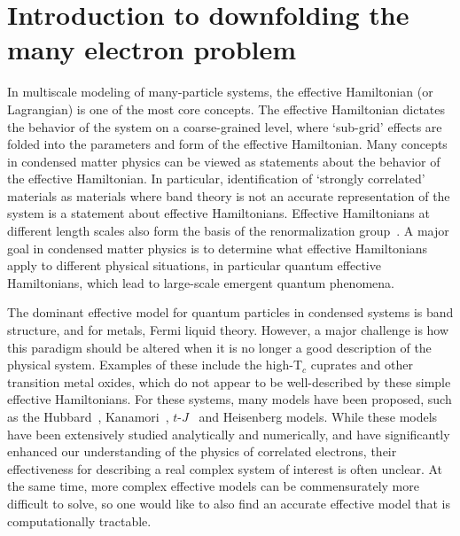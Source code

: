 \section{Introduction to downfolding the many electron problem}

In multiscale modeling of many-particle systems, the effective Hamiltonian (or Lagrangian) is one of the most core concepts. 
The effective Hamiltonian dictates the behavior of the system on a coarse-grained level, where `sub-grid' effects are folded into the parameters and form of the effective Hamiltonian. 
Many concepts in condensed matter physics can be viewed as statements about the behavior of the effective Hamiltonian. 
In particular, identification of `strongly correlated' materials as materials where band theory is not an accurate representation of the system is a statement about effective Hamiltonians.
Effective Hamiltonians at different length scales also form the basis of the renormalization group~\cite{Wilson}.
A major goal in condensed matter physics is to determine what effective Hamiltonians apply to different physical situations, in particular quantum effective Hamiltonians, which lead to large-scale emergent quantum phenomena. 

The dominant effective model for quantum particles in condensed systems is band structure, and for metals, Fermi liquid theory. 
However, a major challenge is how this paradigm should be altered when it is no longer a good description of the physical system.
Examples of these include the high-T$_c$ cuprates and other transition metal oxides, which do not appear to be well-described by these simple effective Hamiltonians. 
For these systems, many models have been proposed, such as the Hubbard~\cite{Hubbard1963}, Kanamori~\cite{Kanamori1963}, $t$-$J$~\cite{tJSpalek} and Heisenberg models.
While these models have been extensively studied analytically and numerically, and have significantly enhanced our understanding of the physics of correlated electrons, their effectiveness for describing a real complex system of interest is often unclear. 
At the same time, more complex effective models can be commensurately more difficult to solve, so one would like to also find an accurate effective model that is computationally tractable.

